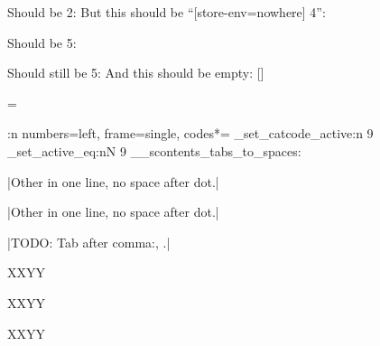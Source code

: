 \documentclass{article}
\begin{document}
\begin{scontents}
[store-env=nowhere]
\4
\end{scontents}
Should be 2: 
But this should be ``[store-env=nowhere] 4'': 

\begin{scontents}%
[store-env=nowhere]
\5
\end{scontents}
Should be 5: 

\begin{scontents}%
\6
\end{scontents}
Should still be 5: 
And this should be empty: []

\interactionmode=\tmpa


\hrulefill

\makeatletter
\let\verbatimsc\@undefined
\let\endverbatimsc\@undefined
\makeatother
\ExplSyntaxOn
\use:n
  {
\ExplSyntaxOff
{}
  {
    numbers=left,
    frame=single,
    codes*=
      {
        \char_set_catcode_active:n { 9 }
        \char_set_active_eq:nN { 9 } \__scontents_tabs_to_spaces:
      }
  }
  }


\Scontents*[store-cmd=nospace]|Other in one line, no space after dot.|

\Scontents*[store-cmd=nospace]|Other	in	one	line,	no	space	after	dot.|

\Scontents*[store-cmd=nospace]|TODO: Tab after comma:,	.|

XXYY\par
XXYY\par
XXYY\par

\par
{}\par
{}\par
{}\par
{}\par
{}\par
{}\par
{}\par
\end{document}
